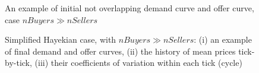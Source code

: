 \documentclass[10pt]{report}
\begin{document}
\begin{appendices}
\begin{figure}[H]
\begin{center}
\caption{An example of initial not overlapping demand curve and offer curve, case $nBuyers \gg nSellers$}
\label{output_3_1a.png}
\end{center}
\end{figure}

\begin{figure}[H]
\begin{center}
\caption{Simplified Hayekian case, with $nBuyers \gg nSellers$: (i) an example of final demand and offer curves, (ii) the history of mean prices tick-by-tick, (iii) their coefficients of variation within each tick (cycle)}
\label{output_3_2a.png}
\end{center}
\end{figure}


\end{appendices}
\end{document}
